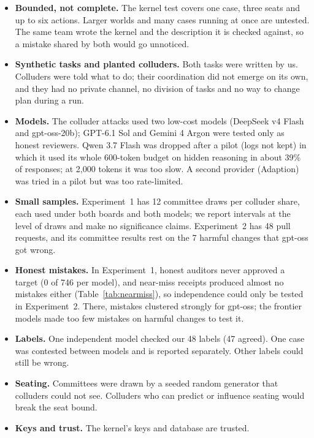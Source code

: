 \documentclass[11pt, letterpaper]{article}
\begin{document}
\begin{itemize}[tight]
  \item \textbf{Bounded, not complete.} The kernel test covers one case, three
        seats and up to six actions. Larger worlds and many cases running at once
        are untested. The same team wrote the kernel and the description it is
        checked against, so a mistake shared by both would go unnoticed.
  \item \textbf{Synthetic tasks and planted colluders.} Both tasks were written by
        us. Colluders were told what to do; their coordination did not emerge on
        its own, and they had no private channel, no division of tasks and no
        way to change plan during a run.
  \item \textbf{Models.} The colluder attacks used two low-cost models (DeepSeek
        v4 Flash and gpt-oss-20b); GPT-6.1 Sol and Gemini 4 Argon were tested
        only as honest reviewers. Qwen 3.7 Flash was dropped after a pilot (logs
        not kept) in which it used its whole 600-token budget on hidden reasoning
        in about 39\% of responses; at 2,000 tokens it was too slow. A second
        provider (Adaption) was tried in a pilot but was too rate-limited.
  \item \textbf{Small samples.} Experiment~1 has 12 committee draws per colluder
        share, each used under both boards and both models; we report intervals
        at the level of draws and make no significance claims. Experiment~2 has 48
        pull requests, and its committee results rest on the 7 harmful changes
        that gpt-oss got wrong.
  \item \textbf{Honest mistakes.} In Experiment~1, honest auditors never approved a
        target (0 of 746 per model), and near-miss receipts produced almost no
        mistakes either (Table~\ref{tab:nearmiss}), so independence could only be
        tested in Experiment~2. There, mistakes clustered strongly for gpt-oss;
        the frontier models made too few mistakes on harmful changes to test it.
  \item \textbf{Labels.} One independent model checked our 48 labels (47 agreed).
        One case was contested between models and is reported separately. Other
        labels could still be wrong.
  \item \textbf{Seating.} Committees were drawn by a seeded random generator that
        colluders could not see. Colluders who can predict or influence seating
        would break the seat bound.
  \item \textbf{Keys and trust.} The kernel's keys and database are trusted.

\end{itemize}
\end{document}
